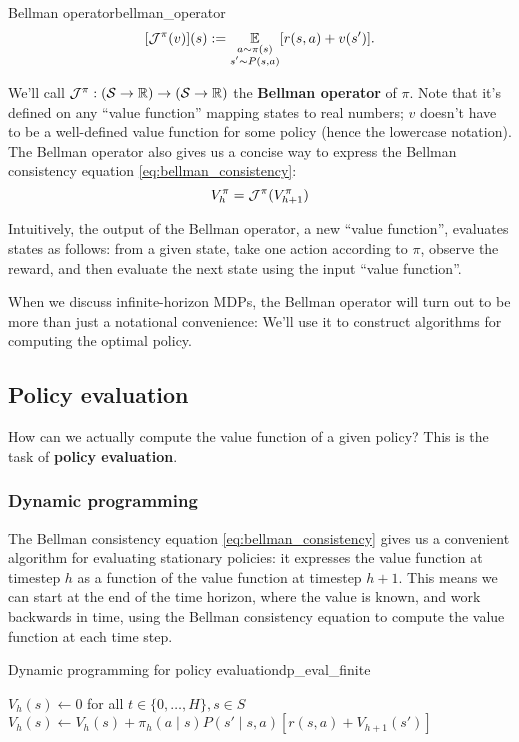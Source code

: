 \documentclass[\main/main]{subfiles}
\begin{document}
\begin{definition}{Bellman operator}{bellman_operator}
\[
    [\mathcal{J}^{\pi}(v)](s) := \operatorname*{\mathbb{E}}_{\substack{a \sim \pi(s) \\ s' \sim P(s, a)}} [r(s, a) + v(s')].
\]
\end{definition}

We'll call $\mathcal{J}^\pi : (\mathcal{S} \to \mathbb{R}) \to (\mathcal{S} \to \mathbb{R})$ the \textbf{Bellman operator} of $\pi$. Note that it's defined on any ``value function'' mapping states to real numbers; $v$ doesn't have to be a well-defined value function for some policy (hence the lowercase notation). The Bellman operator also gives us a concise way to express the Bellman consistency equation \eqref{eq:bellman_consistency}:
\[
    V_h^\pi = \mathcal{J}^{\pi}(V_{h+1}^\pi)
\]

Intuitively, the output of the Bellman operator, a new ``value function'', evaluates states as follows: from a given state, take one action according to $\pi$, observe the reward, and then evaluate the next state using the input ``value function''.

When we discuss infinite-horizon MDPs, the Bellman operator will turn out to be more than just a notational convenience: We'll use it to construct algorithms for computing the optimal policy.

\subsection{Policy evaluation}

How can we actually compute the value function of a given policy? This is the task of \textbf{policy evaluation}.

\subsubsection{Dynamic programming}
\label{sec:dp}

The Bellman consistency equation \eqref{eq:bellman_consistency} gives us a convenient algorithm for evaluating stationary policies: it expresses the value function at timestep $h$ as a function of the value function at timestep $h+1$. This means we can start at the end of the time horizon, where the value is known, and work backwards in time, using the Bellman consistency equation to compute the value function at each time step.

\begin{definition}{Dynamic programming for policy evaluation}{dp_eval_finite}
    \begin{algorithmic}
\State $V_h(s) \gets 0$ for all $t \in \{ 0, \dots, H \}, s \in S$
        \State $V_h(s) \gets V_h(s) + \pi_h(a \mid s) P(s' \mid s, a) [r(s, a) + V_{h+1}(s')]$
    \EndFor
\EndFor
    \end{algorithmic}
\end{definition}
\end{document}
